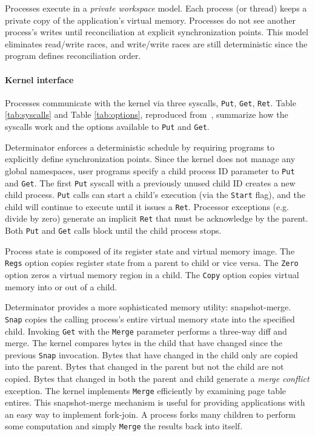 Processes execute in a \emph{private workspace} model. Each process (or thread)
keeps a private copy of the application's virtual memory. Processes do not
see another process's writes until reconciliation at explicit synchronization
points. This model eliminates read/write races, and write/write races are still
deterministic since the program defines reconciliation order.




\paragraph{Kernel interface} Processes communicate with the kernel via three
syscalls, {\tt Put}, {\tt Get}, {\tt Ret}. Table \ref{tab:syscalls} and Table
\ref{tab:options}, reproduced from~\cite{Aviram10}, summarize how the syscalls
work and the options available to {\tt Put} and {\tt Get}.

Determinator enforces a deterministic schedule by requiring programs to
explicitly define synchronization points. Since the kernel does not manage any
global namespaces, user programs specify
a child process ID parameter to {\tt Put} and {\tt Get}. The first {\tt Put}
syscall with a previously unused child ID creates a new child process.
{\tt Put} calls can start a child's execution (via the {\tt Start} flag), and
the child will continue to execute until it issues a {\tt Ret}. Processor
exceptions (e.g. divide by zero) generate an implicit {\tt Ret} that must be
acknowledge by the parent. Both {\tt Put} and {\tt Get} calls block until the
child process stops.

Process state is composed of its register state and virtual memory image.
The {\tt Regs} option copies register state from a parent to child or vice
versa. The {\tt Zero} option zeros a virtual memory region in a child. The
{\tt Copy} option copies virtual memory into or out of a child.

Determinator provides a more sophisticated memory utility: snapshot-merge.
{\tt Snap} copies the calling process's entire virtual memory state into the
specified child. Invoking {\tt Get} with the {\tt Merge} parameter performs a
three-way diff and merge. The kernel compares bytes
in the child that have changed since the previous {\tt Snap} invocation. Bytes
that have changed in the child only are copied into the parent. Bytes that
changed in the parent but not the child are not copied.
Bytes that changed in both the parent and child generate a
\emph{merge conflict} exception. The kernel implements {\tt Merge} efficiently
by examining page table entires. This snapshot-merge mechanism is useful for
providing applications with an easy way to implement fork-join. A process forks
many children to perform some computation and simply {\tt Merge} the results
back into itself.

